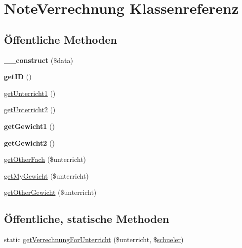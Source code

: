 \hypertarget{class_note_verrechnung}{}\section{Note\+Verrechnung Klassenreferenz}
\label{class_note_verrechnung}
\subsection*{Öffentliche Methoden}
\begin{DoxyCompactItemize}
\item 
\mbox{\label{class_note_verrechnung_a20a30966ec6fcb22b12efff41b86a292}} 
{\bfseries \+\_\+\+\_\+construct} (\$data)
\item 
\mbox{\label{class_note_verrechnung_ac42725fba6800adb8e40888397b55d44}} 
{\bfseries get\+ID} ()
\item 
\mbox{\hyperlink{class_note_verrechnung_af20aab7ad43010ff9516ce978e07ac06}{get\+Unterricht1}} ()
\item 
\mbox{\hyperlink{class_note_verrechnung_a095e0b049ca33b57fdae25a3333258e9}{get\+Unterricht2}} ()
\item 
\mbox{\label{class_note_verrechnung_ae07724616d0fad7d9882718a5bdb2518}} 
{\bfseries get\+Gewicht1} ()
\item 
\mbox{\label{class_note_verrechnung_a67115cf81acbd79d50b6500e398e5a5e}} 
{\bfseries get\+Gewicht2} ()
\item 
\mbox{\hyperlink{class_note_verrechnung_a8c5733d0333212d1510c3c3d68f44e91}{get\+Other\+Fach}} (\$unterricht)
\item 
\mbox{\hyperlink{class_note_verrechnung_afa3f1a8b201ce1d8fdaed35fe8d45df9}{get\+My\+Gewicht}} (\$unterricht)
\item 
\mbox{\hyperlink{class_note_verrechnung_a5407fbfcaeadd642e0bcd791b21e2b31}{get\+Other\+Gewicht}} (\$unterricht)
\end{DoxyCompactItemize}
\subsection*{Öffentliche, statische Methoden}
\begin{DoxyCompactItemize}
\item 
static \mbox{\hyperlink{class_note_verrechnung_a9a07ed366d1759e54b1eed6b0cedcc0a}{get\+Verrechnung\+For\+Unterricht}} (\$unterricht, \$\mbox{\hyperlink{classschueler}{schueler}})
\end{DoxyCompactItemize}


